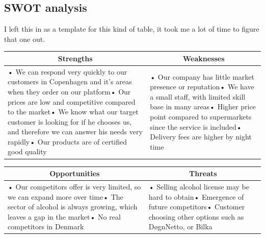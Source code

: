 \documentclass[12p]{article}
\begin{document}

\subsection{SWOT analysis} \label{SWOT}

I left this in as a template for this kind of table, it took me a lot of time to figure that one out.

\begin{table}[H]
  \centering
    \begin{tabular}{|p{}|p{}|}
    \hline
    \multicolumn{1}{|c|}{\textbf{Strengths}} & \multicolumn{1}{c|}{\textbf{Weaknesses}} \\
    \hline
    {• We can respond very quickly to our customers in Copenhagen and it's areas when they order on our platform\newline{}• Our prices are low and competitive compared to the market\newline{}• We know what our target customer is looking for if he chooses us, and therefore we can answer his needs very rapidly\newline{}• Our products are of certified good quality} & • Our company has little market presence or reputation\newline{}• We have a small staff, with limited skill base in many areas\newline{}• Higher price point compared to supermarkets since the service is included\newline{}• Delivery fees are higher by night time \\
    \hline
    \end{tabular}
  \label{tab:swot_one}
\end{table}

\begin{table}[H]
  \centering
    \begin{tabular}{|p{}|p{}|}
    \hline
    \multicolumn{1}{|c|}{\textbf{Opportunities}} & \multicolumn{1}{c|}{\textbf{Threats}} \\
    \hline
    {• Our competitors offer is very limited, so we can expand more over time\newline{}• The sector of alcohol is always growing, which leaves a gap in the market\newline{}• No real competitors in Denmark} & • Selling alcohol license may be hard to obtain\newline{}• Emergence of future competitors\newline{}• Customer choosing other options such as DøgnNetto, or Bilka \\
    \hline
    \end{tabular}
  \label{tab:swot_two}
\end{table}
\end{document}
